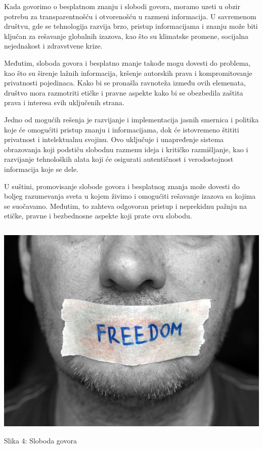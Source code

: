 \documentclass[a4paper]{article}
\begin{document}
{Kada govorimo o besplatnom znanju i slobodi govora, moramo uzeti u obzir potrebu za transparentnošću i otvorenošću u razmeni informacija. U savremenom društvu, gde se tehnologija razvija brzo, pristup informacijama i znanju može biti ključan za rešavanje globalnih izazova, kao što su klimatske promene, socijalna nejednakost i zdravstvene krize.

Međutim, sloboda govora i besplatno znanje takođe mogu dovesti do problema, kao što su širenje lažnih informacija, kršenje autorskih prava i kompromitovanje privatnosti pojedinaca. Kako bi se pronašla ravnoteža između ovih elemenata, društvo mora razmotriti etičke i pravne aspekte kako bi se obezbedila zaštita prava i interesa svih uključenih strana.

Jedno od mogućih rešenja je razvijanje i implementacija jasnih smernica i politika koje će omogućiti pristup znanju i informacijama, dok će istovremeno štititi privatnost i intelektualnu svojinu. Ovo uključuje i unapređenje sistema obrazovanja koji podstiču slobodnu razmenu ideja i kritičko razmišljanje, kao i razvijanje tehnoloških alata koji će osigurati autentičnost i verodostojnost informacija koje se dele.

U suštini, promovisanje slobode govora i besplatnog znanja može dovesti do boljeg razumevanja sveta u kojem živimo i omogućiti rešavanje izazova sa kojima se suočavamo. Međutim, to zahteva odgovoran pristup i neprekidnu pažnju na etičke, pravne i bezbednosne aspekte koji prate ovu slobodu.


\begin{verbatim}

\end{verbatim}

\begin{center}
\includegraphics[scale=0.35]{sloboda_govora.jpg}
\end{center}
\caption{Slika 4: Sloboda govora}
\label{Sloboda govora}


}
\end{document}
